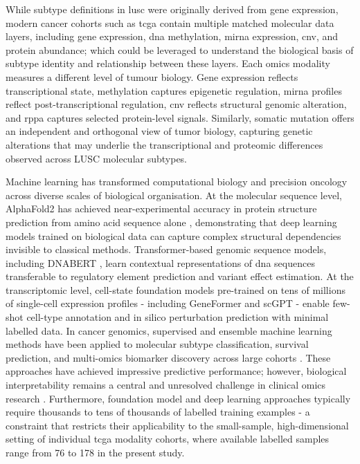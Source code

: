 While subtype definitions in \gls{lusc} were originally derived from gene expression, modern cancer cohorts such as \gls{tcga} contain multiple matched molecular data layers, including gene expression, \gls{dna} methylation, \gls{mirna} expression, \gls{cnv}, and protein abundance; which could be leveraged to understand the biological basis of subtype identity and relationship between these layers. Each omics modality measures a different level of tumour biology. Gene expression reflects transcriptional state, methylation captures epigenetic regulation, \gls{mirna} profiles reflect post-transcriptional regulation, \gls{cnv} reflects structural genomic alteration, and \gls{rppa} captures selected protein-level signals. Similarly, somatic mutation offers an independent and orthogonal view of tumor biology, capturing genetic alterations that may underlie the transcriptional and proteomic differences observed across LUSC molecular subtypes.

Machine learning has transformed computational biology and precision oncology across diverse scales of biological organisation. At the molecular sequence level, AlphaFold2 has achieved near-experimental accuracy in protein structure prediction from amino acid sequence alone \parencite{Jumper2021}, demonstrating that deep learning models trained on biological data can capture complex structural dependencies invisible to classical methods. Transformer-based genomic sequence models, including DNABERT \parencite{Ji2021}, learn contextual representations of \gls{dna} sequences transferable to regulatory element prediction and variant effect estimation. At the transcriptomic level, cell-state foundation models pre-trained on tens of millions of single-cell expression profiles - including GeneFormer \parencite{Theodoris2023} and scGPT \parencite{Cui2024}- enable few-shot cell-type annotation and in silico perturbation prediction with minimal labelled data. In cancer genomics, supervised and ensemble machine learning methods have been applied to molecular subtype classification, survival prediction, and multi-omics biomarker discovery across large
cohorts \parencite{Hoadley2018,Picard2021,Nicora2020}. These approaches have achieved impressive predictive performance; however, biological interpretability remains a central and unresolved challenge in clinical omics research \parencite{Janssen2024}. Furthermore, foundation model and deep learning approaches typically require thousands to tens of thousands of labelled training examples - a constraint that restricts their applicability to the small-sample, high-dimensional setting of individual \gls{tcga} modality cohorts, where available labelled samples range from 76 to 178 in the present study.

